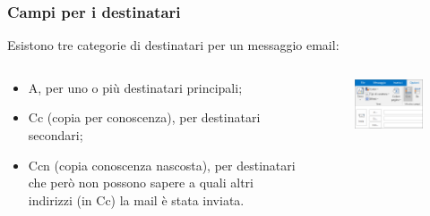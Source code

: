 \documentclass[handout]{beamer}
\begin{document}
\begin{frame}
\frametitle{Campi per i destinatari}
Esistono tre categorie di destinatari per un messaggio email:
\begin{columns}
  \begin{column}{0.5\textwidth}
  \begin{itemize}
   \item \alert<1>{A}, per uno o più destinatari principali;\pause
   \item \alert<2>{Cc} (copia per conoscenza), per destinatari secondari;\pause
   \item \alert<3>{Ccn} (copia conoscenza nascosta), per destinatari che però non possono sapere a quali altri indirizzi (in Cc) la mail è stata inviata.
  \end{itemize}
  \end{column}
  \begin{column}{0.4\textwidth}
  \begin{figure}
  \includegraphics[width=\columnwidth]{img/accccn.png}
  \end{figure}
  \end{column}
\end{columns}
\end{frame}
\end{document}
